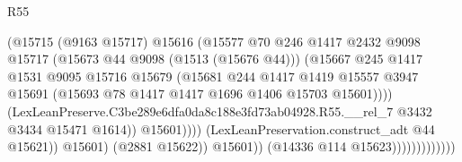 \begin{lexlean}{R55}
\begin{coremodule}
{{                                              (@15715
                                                (@9163 @15717)
                                                @15616
                                                (@15577
                                                  @70
                                                  @246
                                                  @1417
                                                  @2432
                                                  @9098
                                                  @15717
                                                  (@15673 @44 @9098 (@1513 (@15676 @44)))
                                                  (@15667
                                                    @245
                                                    @1417
                                                    @1531
                                                    @9095
                                                    @15716
                                                    @15679
                                                    (@15681
                                                      @244
                                                      @1417
                                                      @1419
                                                      @15557
                                                      @3947
                                                      @15691
                                                      (@15693
                                                        @78
                                                        @1417
                                                        @1417
                                                        @1696
                                                        @1406
                                                        @15703
                                                        @15601))))
                                                (LexLeanPreserve.C3be289e6dfa0da8c188e3fd73ab04928.R55.__rel_7
                                                  @3432
                                                  @3434
                                                  @15471
                                                  @1614))
                                              @15601))))
                                      (LexLeanPreservation.construct_adt @44 @15621))
                                    @15601)
                                  (@2881 @15622))
                                @15601))
                            (@14336 @114 @15623)))))))))))))
}}
\end{coremodule}
\end{lexlean}
